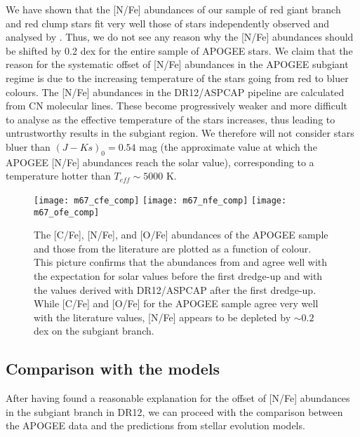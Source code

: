 \documentclass[a4paper,fleqn,usenatbib]{mnras}
\begin{document}
We have shown that the [N/Fe] abundances of our sample of red giant branch and red clump stars fit very well those of stars independently observed and analysed by \citet{tautv2000}. Thus, we do not see any reason why the [N/Fe] abundances should be shifted by 0.2 dex for the entire sample of APOGEE stars. We claim that the reason for the systematic offset of [N/Fe] abundances in the APOGEE subgiant regime is due to the increasing temperature of the stars going from red to bluer colours. 
The [N/Fe] abundances in the DR12/ASPCAP pipeline are calculated from CN molecular lines. These become progressively weaker and more difficult to analyse as the effective temperature of the stars increases, thus leading to untrustworthy results in the subgiant region.  We therefore will not consider stars bluer than $(J-Ks)_0=0.54$ mag (the approximate value at which the APOGEE [N/Fe] abundances reach the solar value), corresponding to a temperature hotter than $T_{eff}\sim 5000$ K.

\begin{figure}
	\texttt{[image: m67\_cfe\_comp]}
	\texttt{[image: m67\_nfe\_comp]}
	\texttt{[image: m67\_ofe\_comp]}
	\caption{The [C/Fe], [N/Fe], and [O/Fe] abundances of the APOGEE sample and those from the literature are plotted as a function of colour. This picture confirms that the abundances from \citet{shetrone2000} and \citet{tautv2000} agree well with the expectation for solar values before the first dredge-up and with the values derived with DR12/ASPCAP after the first dredge-up. While [C/Fe] and [O/Fe] for the APOGEE sample agree very well with the literature values, [N/Fe] appears to be depleted by $\sim0.2$ dex on the subgiant branch.}
	\label{fig:cfe_comp}
\end{figure}



\subsection{Comparison with the models}
\label{sec:mod}

After having found a reasonable explanation for the offset of [N/Fe] abundances in the subgiant branch in DR12, we can proceed with the comparison between the APOGEE data and the predictions from stellar evolution models.
\end{document}
